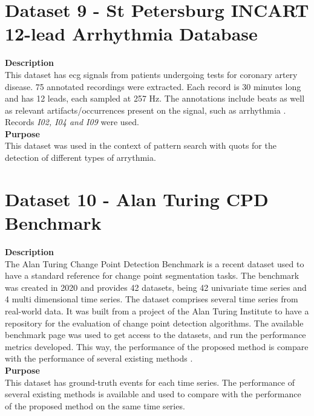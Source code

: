 \section{Dataset 9 - St Petersburg INCART 12-lead Arrhythmia Database}
\label{dat:dataset9}
\textbf{Description}\hfill \\
This dataset has \gls{ecg} signals from patients undergoing tests for coronary artery disease. 75 annotated recordings were extracted. Each record is 30 minutes long and has 12 leads, each sampled at 257 Hz. The annotations include beats as well as relevant artifacts/occurrences present on the signal, such as arrhythmia \cite{PhysioNet}. Records \textit{I02, I04 and I09} were used.\\
\textbf{Purpose}\hfill \\
This dataset was used in the context of pattern search with \gls{quots} for the detection of different types of arrythmia.


\section{Dataset 10 - Alan Turing CPD Benchmark}
\label{sec:dataset10}
\textbf{Description}\hfill \\
The Alan Turing Change Point Detection Benchmark is a recent dataset used to have a standard reference for change point segmentation tasks. The benchmark was created in 2020 and provides 42 datasets, being 42 univariate time series and 4 multi dimensional time series. The dataset comprises several time series from real-world data. It was built from a project of the Alan Turing Institute to have a repository for the evaluation of change point detection algorithms. The available benchmark page was used to get access to the datasets, and run the performance metrics developed. This way, the performance of the proposed method is compare with the performance of several existing methods \cite{cpd_alan}.\\
\textbf{Purpose}\hfill \\
This dataset has ground-truth events for each time series. The performance of several existing methods is available and used to compare with the performance of the proposed method on the same time series.

